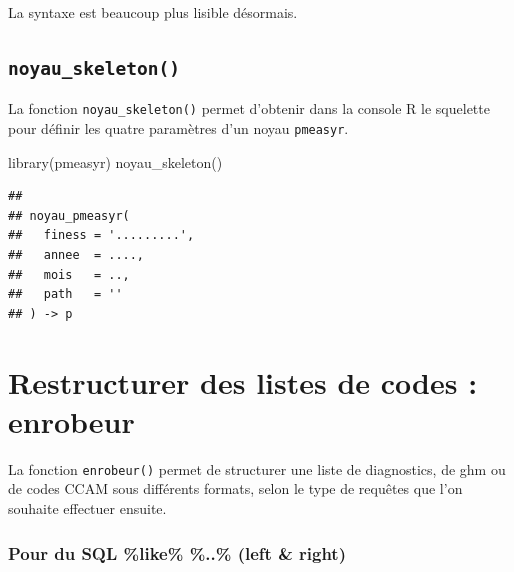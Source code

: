 \documentclass[
]{book}
\newenvironment{Shaded}{\begin{snugshade}}{\end{snugshade}}
\newcommand{\FunctionTok}[1]{\textcolor[rgb]{0.00,0.00,0.00}{#1}}
\newcommand{\NormalTok}[1]{#1}
\begin{document}
La syntaxe est beaucoup plus lisible désormais.

\hypertarget{noyau_skeleton}{%
\section{\texorpdfstring{\texttt{noyau\_skeleton()}}{noyau\_skeleton()}}\label{noyau_skeleton}}

La fonction \texttt{noyau\_skeleton()} permet d'obtenir dans la console R le squelette pour définir les quatre paramètres d'un noyau \texttt{pmeasyr}.

\begin{Shaded}
\begin{Highlighting}[]
\FunctionTok{library}\NormalTok{(pmeasyr)}
\FunctionTok{noyau\_skeleton}\NormalTok{()}
\end{Highlighting}
\end{Shaded}

\begin{verbatim}
## 
## noyau_pmeasyr(
##   finess = '.........',
##   annee  = ....,
##   mois   = ..,
##   path   = ''
## ) -> p
\end{verbatim}

\hypertarget{restructurer-des-listes-de-codes-enrobeur}{%
\chapter{Restructurer des listes de codes : enrobeur}\label{restructurer-des-listes-de-codes-enrobeur}}

La fonction \texttt{enrobeur()} permet de structurer une liste de diagnostics, de ghm ou de codes CCAM sous différents formats, selon le type de requêtes que l'on souhaite effectuer ensuite.

\hypertarget{pour-du-sql-like-..-left-right}{%
\subsection{Pour du SQL \%like\% \%..\% (left \& right)}\label{pour-du-sql-like-..-left-right}}
\end{document}
